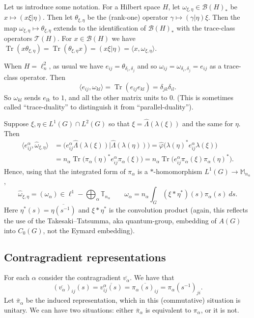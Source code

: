 \documentclass[twoside,a4paper,12pt]{article}
\theoremstyle{plain}
\theoremstyle{definition}
\newcommand{\ip}[2]{\langle #1,#2 \rangle}
\newcommand{\mc}{\mathcal}
\newcommand{\tr}{\operatorname{Tr}}
\begin{document}
Let us introduce some notation.  For a Hilbert space $H$, let
$\omega_{\xi,\eta} \in \mc B(H)_*$ be $x\mapsto (x\xi|\eta)$.  Then let
$\theta_{\xi,\eta}$ be the (rank-one) operator $\gamma \mapsto (\gamma|\eta)\xi$.
Then the map $\omega_{\xi,\eta} \mapsto \theta_{\xi,\eta}$ extends to the
identification of $\mc B(H)_*$ with the trace-class operators $\mc T(H)$.  For
$x\in\mc B(H)$ we have $\tr(x\theta_{\xi,\eta}) = \tr(\theta_{\xi,\eta} x)
= (x\xi|\eta) = \ip{x}{\omega_{\xi,\eta}}$.

When $H=\ell^2_n$, as usual we have $e_{ij} = \theta_{\delta_i,\delta_j}$
and so $\omega_{ij} = \omega_{\delta_i,\delta_j}=e_{ij}$ as a trace-class
operator.  Then
\[ \ip{e_{ij}}{\omega_{kl}} = \tr(e_{ij} e_{kl}) = \delta_{jk} \delta_{il}. \]
So $\omega_{kl}$ sends $e_{lk}$ to $1$, and all the other matrix units to $0$.
(This is sometimes called ``trace-duality'' to distinguish it from
``parallel-duality'').  

Suppose $\xi,\eta\in L^1(G)\cap L^2(G)$ so that
$\xi = \hat\Lambda(\lambda(\xi))$ and the same for $\eta$.  Then
\begin{align*} \ip{e^\alpha_{ij}}{\hat\omega_{\xi,\eta}}
&= \big( e^\alpha_{ij} \hat\Lambda(\lambda(\xi)) \big|
   \hat\Lambda(\lambda(\eta)) \big)
= \hat\varphi\big( \lambda(\eta)^* e^\alpha_{ij} \lambda(\xi) \big) \\
&= n_\alpha \tr\big( \pi_\alpha(\eta)^* e^\alpha_{ij} \pi_\alpha(\xi) \big)
= n_\alpha \tr\big( e^\alpha_{ij} \pi_\alpha(\xi)\pi_\alpha(\eta)^* \big).
\end{align*}
Hence, using that the integrated form of $\pi_\alpha$ is a $*$-homomorphism
$L^1(G)\rightarrow\mathbb M_{n_\alpha}$,
\[ \hat\omega_{\xi,\eta} = (\omega_\alpha) \in \ell^1-\bigoplus_\alpha
\mathbb T_{n_\alpha} \qquad \omega_\alpha = 
n_\alpha \int_G (\xi*\eta^*)(s) \pi_\alpha(s)\ ds. \]
Here $\eta^*(s) = \overline{\eta(s^{-1})}$ and $\xi*\eta^*$ is the convolution
product (again, this reflects the use of the Takesaki--Tatsumma, aka quantum-group,
embedding of $A(G)$ into $C_0(G)$, not the Eymard embedding).



\subsection{Contragradient representations}

For each $\alpha$ consider the contragradient $\overline{v_\alpha}$.  We have
that
\[ (\overline{v_\alpha})_{ij}(s) = \overline{ v^\alpha_{ij}(s) }
= \overline{ \pi_\alpha(s)_{ij} } = \pi_\alpha(s^{-1})_{ji}. \]
Let $\overline{\pi}_\alpha$ be the induced representation, which in this
(commutative) situation is unitary.  We can have two situations: either
$\overline{\pi}_\alpha$ is equivalent to $\pi_\alpha$, or it is not.
\end{document}
